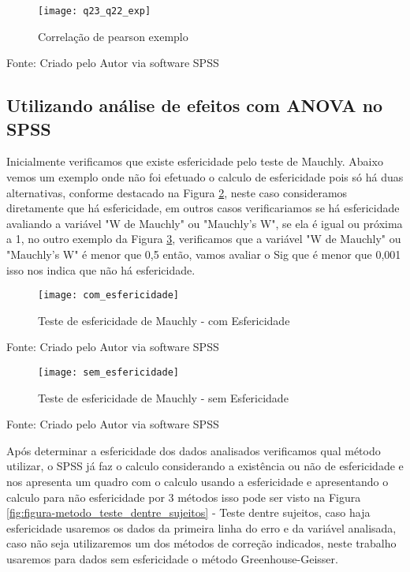 \begin{figure}[H]
	\centering	
	\caption{Correlação de pearson exemplo}
	\texttt{[image: q23\_q22\_exp]}
	\label{fig:figura-q23_q22_exp}
\end{figure}
\vspace{-0.8 cm} \hspace{2.85 cm} Fonte: Criado pelo Autor via software SPSS\newline

\subsection{Utilizando análise de efeitos com ANOVA no SPSS}

Inicialmente verificamos que existe esfericidade pelo teste de Mauchly. Abaixo vemos um exemplo onde não foi efetuado o calculo de  esfericidade pois só há duas alternativas,  conforme destacado na Figura \ref{fig:figura-com_esfericidade}, neste caso consideramos diretamente que há esfericidade, em outros casos verificariamos se há esfericidade avaliando a variável "W de Mauchly" ou "Mauchly's W", se ela é igual ou próxima a 1, no outro exemplo da Figura \ref{fig:figura-sem_esfericidade}, verificamos que a variável "W de Mauchly" ou "Mauchly's W" é menor que 0,5 então, vamos avaliar o Sig que é menor que 0,001 isso nos indica que não há esfericidade.

\begin{figure}[H]
	\centering	
	\caption{Teste de esfericidade de Mauchly - com Esfericidade}
	\texttt{[image: com\_esfericidade]}
	\label{fig:figura-com_esfericidade}
\end{figure}
\vspace{-0.8 cm} \hspace{2.85 cm} Fonte: Criado pelo Autor via software SPSS\newline

\begin{figure}[H]
	\centering	
	\caption{Teste de esfericidade de Mauchly - sem Esfericidade}
	\texttt{[image: sem\_esfericidade]}
	\label{fig:figura-sem_esfericidade}
\end{figure}
\vspace{-0.8 cm} \hspace{2.85 cm} Fonte: Criado pelo Autor via software SPSS\newline

Após determinar a esfericidade dos dados analisados verificamos qual método utilizar, o SPSS já faz o calculo considerando a existência ou não de esfericidade e nos apresenta um quadro com o calculo usando a esfericidade e apresentando o calculo para não esfericidade por 3 métodos isso pode ser visto na Figura \ref{fig:figura-metodo_teste_dentre_sujeitos} - Teste dentre sujeitos, caso haja esfericidade usaremos os dados da primeira linha do erro e da variável analisada, caso não seja utilizaremos um dos métodos de correção indicados, neste trabalho usaremos para dados sem esfericidade o método Greenhouse-Geisser.

